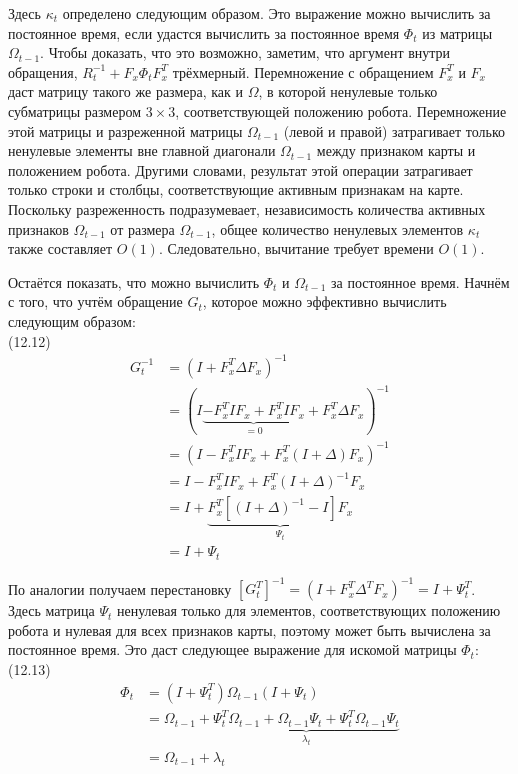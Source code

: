 \documentclass[10pt,a4paper]{article}
\begin{document}
Здесь $\kappa_t$ определено следующим образом. Это выражение можно вычислить за постоянное время, если удастся вычислить за постоянное время $\varPhi_t$ из матрицы $\varOmega_{t-1}$. Чтобы доказать, что это возможно, заметим, что аргумент внутри обращения, $R_t^{-1}+F_x\varPhi_tF_x^T$ трёхмерный. Перемножение с обращением $F_x^T$ и $F_x$ даст матрицу такого же размера, как и $\varOmega$, в которой ненулевые только субматрицы размером $3\times3$, соответствующей положению робота. Перемножение этой матрицы и разреженной матрицы $\varOmega_{t-1}$ (левой и правой) затрагивает только ненулевые элементы вне главной диагонали $\varOmega_{t-1}$ между признаком карты и положением робота. Другими словами, результат этой операции затрагивает только строки и столбцы, соответствующие активным признакам на карте. Поскольку разреженность подразумевает, независимость количества активных признаков $\varOmega_{t-1}$ от размера $\varOmega_{t-1}$, общее количество ненулевых элементов $\kappa_t$ также составляет $O(1)$. Следовательно, вычитание требует времени $O(1)$.

Остаётся показать, что можно вычислить $\varPhi_t$ и $\varOmega_{t-1}$ за постоянное время. Начнём с того, что учтём обращение $G_t$, которое можно эффективно вычислить следующим образом:\\

(12.12)
\begin{equation*}
\begin{split}
G_t^{-1}&=(I+F_x^T\varDelta F_x)^{-1}\\
&=(I\underbrace{-F_x^TIF_x+F_x^TIF_x}_{=0}+F_x^T\varDelta F_x)^{-1}\\
&=(I-F_x^TIF_x+F_x^T(I+\varDelta)F_x)^{-1}\\
&=I-F_x^TIF_x+F_x^T(I+\varDelta)^{-1}F_x\\
&=I+\underbrace{F_x^T[(I+\varDelta)^{-1}-I]F_x}_{\varPsi_t}\\
&=I+\varPsi_t
\end{split}
\end{equation*}

По аналогии получаем перестановку $[G_t^T]^{-1}=(I+F_x^T\varDelta^TF_x)^{-1}=I+\varPsi_t^T$. Здесь матрица $\varPsi_t$ ненулевая только для элементов, соответствующих положению робота и нулевая для всех признаков карты, поэтому может быть вычислена за постоянное время. Это даст следующее выражение для искомой матрицы $\varPhi_t$:\\

(12.13)
\begin{equation*}
\begin{split}
\varPhi_t&=(I+\varPsi_t^T)\varOmega_{t-1}(I+\varPsi_t)\\
&=\varOmega_{t-1}+\underbrace{\varPsi_t^T\varOmega_{t-1}+\varOmega_{t-1}\varPsi_t+\varPsi_t^T\varOmega_{t-1}\varPsi_t}_{\lambda_t}\\
&=\varOmega_{t-1}+\lambda_t
\end{split}
\end{equation*}
\end{document}
